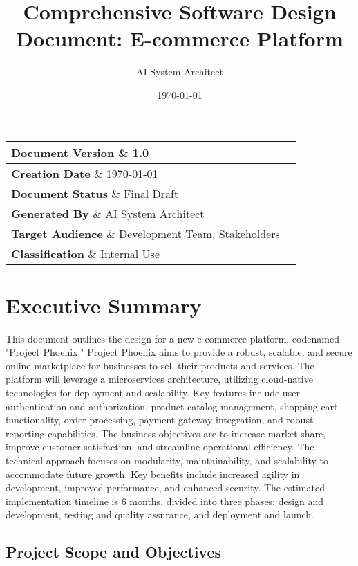 \documentclass[11pt,a4paper,oneside]{article}
\title{\Huge\textbf{Comprehensive Software Design Document: E-commerce Platform}}
\author{\Large AI System Architect}
\date{\Large\today}
\begin{document}
\maketitle
\thispagestyle{empty}
\vfill

\begin{center}
\large
\begin{tabular}{|l|l|}
\hline
\textbf{Document Version} \& 1.0 \\
\hline
\textbf{Creation Date} \& \today \\
\hline
\textbf{Document Status} \& Final Draft \\
\hline
\textbf{Generated By} \& AI System Architect \\
\hline
\textbf{Target Audience} \& Development Team, Stakeholders \\
\hline
\textbf{Classification} \& Internal Use \\
\hline
\end{tabular}
\end{center}

\newpage
\tableofcontents
\newpage
\listoffigures
\newpage

\section{Executive Summary}

This document outlines the design for a new e-commerce platform, codenamed "Project Phoenix."  Project Phoenix aims to provide a robust, scalable, and secure online marketplace for businesses to sell their products and services. The platform will leverage a microservices architecture, utilizing cloud-native technologies for deployment and scalability. Key features include user authentication and authorization, product catalog management, shopping cart functionality, order processing, payment gateway integration, and robust reporting capabilities. The business objectives are to increase market share, improve customer satisfaction, and streamline operational efficiency.  The technical approach focuses on modularity, maintainability, and scalability to accommodate future growth.  Key benefits include increased agility in development, improved performance, and enhanced security. The estimated implementation timeline is 6 months, divided into three phases:  design and development, testing and quality assurance, and deployment and launch.

\subsection{Project Scope and Objectives}
\end{document}
